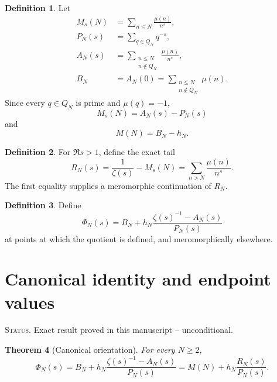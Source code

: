 \documentclass[11pt]{amsart}
\numberwithin{equation}{section}
\theoremstyle{plain}
\newtheorem{theorem}{Theorem}[section]
\theoremstyle{definition}
\newtheorem{definition}[theorem]{Definition}
\theoremstyle{remark}
\newcommand{\1}{\mathbf{1}}
\newcommand{\statusnote}[1]{%
  \par\smallskip\noindent
  \begingroup\footnotesize\textsc{Status.} #1\endgroup
  \par\smallskip}
\begin{document}
\begin{definition}
\label{def:mobius_polynomials}
Let
\begin{align}
M_s(N)
&=
\sum_{n\leq N}\frac{\mu(n)}{n^s},
\label{eq:MsN_definition}
\\
P_N(s)
&=
\sum_{q\in Q_N}q^{-s},
\label{eq:PN_definition}
\\
A_N(s)
&=
\sum_{\substack{n\leq N\\n\notin Q_N}}
\frac{\mu(n)}{n^s},
\label{eq:AN_definition}
\\
B_N
&=
A_N(0)
=
\sum_{\substack{n\leq N\\n\notin Q_N}}\mu(n).
\label{eq:BN_definition}
\end{align}
Since every \(q\in Q_N\) is prime and \(\mu(q)=-1\),
\begin{equation}
M_s(N)=A_N(s)-P_N(s)
\label{eq:Ms_A_minus_P}
\end{equation}
and
\begin{equation}
M(N)=B_N-h_N.
\label{eq:M_B_minus_h}
\end{equation}
\end{definition}

\begin{definition}
\label{def:tail_RN}
For \(\Re s>1\), define the exact tail
\begin{equation}
R_N(s)
=
\frac{1}{\zeta(s)}-M_s(N)
=
\sum_{n>N}\frac{\mu(n)}{n^s}.
\label{eq:RN_definition}
\end{equation}
The first equality supplies a meromorphic continuation of \(R_N\).
\end{definition}

\begin{definition}
\label{def:PhiN}
Define
\begin{equation}
\Phi_N(s)
=
B_N+
h_N\frac{\zeta(s)^{-1}-A_N(s)}{P_N(s)}
\label{eq:PhiN_definition}
\end{equation}
at points at which the quotient is defined, and meromorphically elsewhere.
\end{definition}

\section{Canonical identity and endpoint values}
\label{sec:canonical_identity}

\statusnote{Exact result proved in this manuscript -- unconditional.}
\begin{theorem}[Canonical orientation]
\label{thm:canonical_orientation}
For every \(N\geq2\),
\begin{equation}
\boxed{
\Phi_N(s)
=
B_N+
h_N\frac{\zeta(s)^{-1}-A_N(s)}{P_N(s)}
=
M(N)+h_N\frac{R_N(s)}{P_N(s)}.
}
\label{eq:canonical_orientation}
\end{equation}
\end{theorem}
\end{document}
